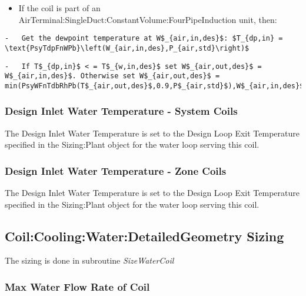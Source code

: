 \begin{itemize}
\tightlist
\item
  If the coil is part of an AirTerminal:SingleDuct:ConstantVolume:FourPipeInduction unit, then:
\end{itemize}

\begin{lstlisting}
-   Get the dewpoint temperature at W$_{air,in,des}$: $T_{dp,in} = \text{PsyTdpFnWPb}\left(W_{air,in,des},P_{air,std}\right)$
\end{lstlisting}

\begin{lstlisting}
-   If T$_{dp,in}$ < = T$_{w,in,des}$ set W$_{air,out,des}$ = W$_{air,in,des}$. Otherwise set W$_{air,out,des}$ = min(PsyWFnTdbRhPb(T$_{air,out,des}$,0.9,P$_{air,std}$),W$_{air,in,des}$)
\end{lstlisting}

\subsubsection{Design Inlet Water Temperature - System Coils}\label{design-inlet-water-temperature---system-coils}

The Design Inlet Water Temperature is set to the Design Loop Exit Temperature specified in the Sizing:Plant object for the water loop serving this coil.

\subsubsection{Design Inlet Water Temperature - Zone Coils}\label{design-inlet-water-temperature---zone-coils}

The Design Inlet Water Temperature is set to the Design Loop Exit Temperature specified in the Sizing:Plant object for the water loop serving this coil.

\subsection{Coil:Cooling:Water:DetailedGeometry Sizing}\label{coilcoolingwaterdetailedgeometry-sizing}

The sizing is done in subroutine \emph{SizeWaterCoil}

\subsubsection{Max Water Flow Rate of Coil}\label{max-water-flow-rate-of-coil}

